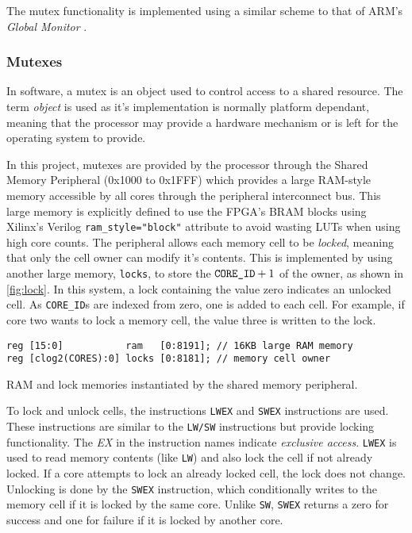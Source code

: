 The mutex functionality is implemented using a similar scheme to that of ARM's \textit{Global Monitor} \cite{armgmonitor}.

\subsubsection{Mutexes}
In software, a mutex is an object used to control access to a shared resource. The term \textit{object} is used as it's implementation is normally platform dependant, meaning that the processor may provide a hardware mechanism or is left for the operating system to provide.

In this project, mutexes are provided by the processor through the Shared Memory Peripheral (0x1000 to 0x1FFF) which provides a large RAM-style memory accessible by all cores through the peripheral interconnect bus. This large memory is explicitly defined to use the FPGA's BRAM blocks using Xilinx's Verilog \verb|ram_style="block"| attribute to avoid wasting LUTs when using high core counts. The peripheral allows each memory cell to be \textit{locked}, meaning that only the cell owner can modify it's contents. This is implemented by using another large memory, \verb|locks|, to store the $\verb|CORE_ID| + 1$ of the owner, as shown in \cref{fig:lock}. In this system, a lock containing the value zero indicates an unlocked cell. As \verb|CORE_ID|s are indexed from zero, one is added to each cell. For example, if core two wants to lock a memory cell, the value three is written to the lock.

\begin{listing}[h]
\centering
\begin{verbatim}
reg [15:0]           ram   [0:8191]; // 16KB large RAM memory
reg [clog2(CORES):0] locks [0:8181]; // memory cell owner
\end{verbatim}
\caption{RAM and lock memories instantiated by the shared memory peripheral.}
\label{fig:lock}
\end{listing}

To lock and unlock cells, the instructions \verb|LWEX| and \verb|SWEX| instructions are used. These instructions are similar to the \verb|LW/SW| instructions but provide locking functionality. The \textit{EX} in the instruction names indicate \textit{exclusive access}. \verb|LWEX| is used to read memory contents  (like \verb|LW|) and also lock the cell if not already locked. If a core attempts to lock an already locked cell, the lock does not change. Unlocking is done by the \verb|SWEX| instruction, which conditionally writes to the memory cell if it is locked by the same core. Unlike \verb|SW|, \verb|SWEX| returns a zero for success and one for failure if it is locked by another core.

